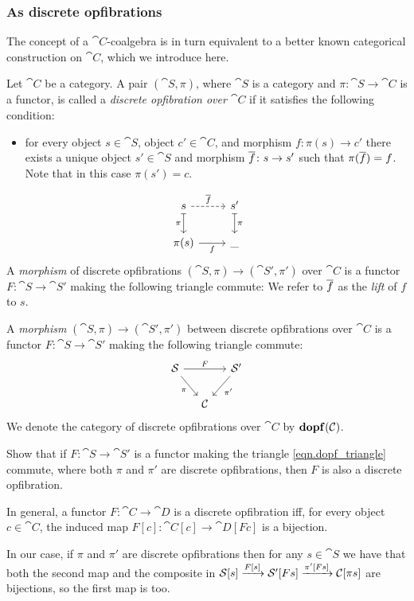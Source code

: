 \documentclass[Book-Poly]{subfiles}
\begin{document}
\subsubsection{As discrete opfibrations}

The concept of a $\cat{C}$-coalgebra is in turn equivalent to a better known categorical construction on $\cat{C}$, which we introduce here.

\begin{definition}\label{def.dopf}
Let $\cat{C}$ be a category. A pair $(\cat{S},\pi)$, where $\cat{S}$ is a category and $\pi\colon\cat{S}\to\cat{C}$ is a functor, is called a \emph{discrete opfibration over $\cat{C}$} if it satisfies the following condition:
\begin{itemize}
	\item for every object $s\in\cat{S}$, object $c'\in\cat{C}$, and morphism $f\colon \pi(s)\to c'$ there exists a unique object $s'\in\cat{S}$ and morphism $\overline{f}\colon s\to s'$ such that $\pi(\overline{f})=f$. Note that in this case $\pi(s')=c$.
\end{itemize}
\[
\begin{tikzcd}
  s\ar[r, dashed, "\ol{f}"]\ar[d, |->, "\pi"']&
  s'\ar[d, |->, "\pi"]\\
  \pi(s)\ar[r, "f"']&
  \_\vphantom{()}
\end{tikzcd}
\]
A \emph{morphism} of discrete opfibrations $(\cat{S},\pi)\to(\cat{S}',\pi')$ over $\cat{C}$ is a functor $F\colon\cat{S}\to\cat{S}'$ making the following triangle commute:
We refer to $\overline{f}$ as the \emph{lift} of $f$ to $s$.

A \emph{morphism} $(\cat{S},\pi)\to(\cat{S}',\pi')$ between discrete opfibrations over $\cat{C}$ is a functor $F\colon\cat{S}\to\cat{S}'$ making the following triangle commute:
\begin{equation}\label{eqn.dopf_triangle}
\begin{tikzcd}[column sep=small]
	\cat{S}\ar[dr, "\pi"']\ar[rr, "F"]&&
	\cat{S}'\ar[dl, "\pi'"]\\&
	\cat{C}
\end{tikzcd}
\end{equation}
We denote the category of discrete opfibrations over $\cat{C}$ by $\mathbf{dopf}(\mathcal{C})$.
\end{definition}

\begin{exercise}
Show that if $F\colon \cat{S}\to\cat{S}'$ is a functor making the triangle \eqref{eqn.dopf_triangle} commute, where both $\pi$ and $\pi'$ are discrete opfibrations, then $F$ is also a discrete opfibration.
\begin{solution}
In general, a functor $F\colon\cat{C}\to\cat{D}$ is a discrete opfibration iff, for every object $c\in\cat{C}$, the induced map $F[c]\colon\cat{C}[c]\to\cat{D}[Fc]$ is a bijection.

In our case, if $\pi$ and $\pi'$ are discrete opfibrations then for any $s\in\cat{S}$ we have that both the second map and the composite in $\mathcal{S}[s]\xrightarrow{F[s]}\mathcal{S}'[Fs]\xrightarrow{\pi'[Fs]}\mathcal{C}[\pi s]$ are bijections, so the first map is too.
\end{solution}
\end{exercise}
\end{document}
